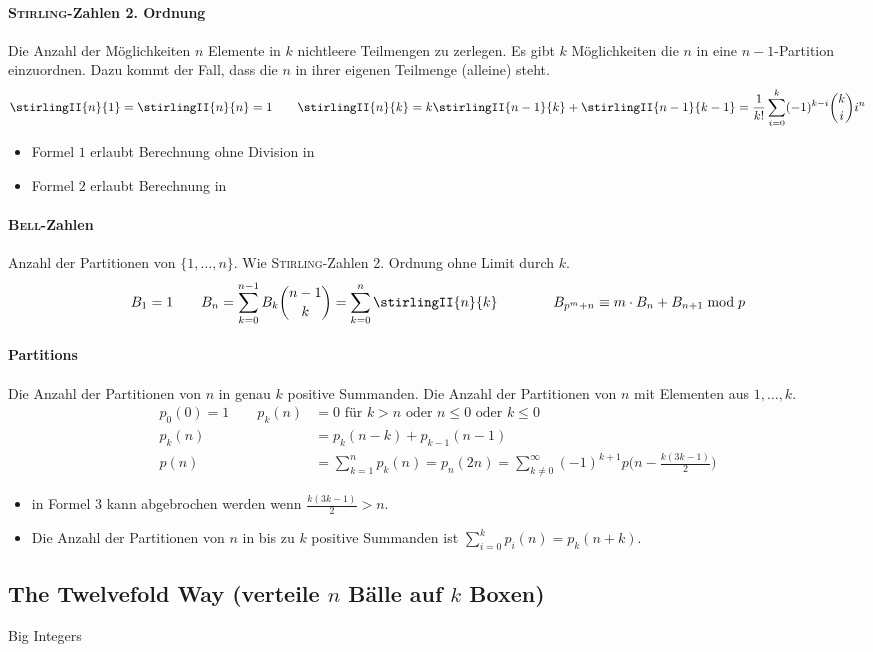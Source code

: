 \paragraph{\textsc{Stirling}-Zahlen 2. Ordnung}
Die Anzahl der Möglichkeiten $n$ Elemente in $k$ nichtleere Teilmengen zu zerlegen.
Es gibt $k$ Möglichkeiten die $n$ in eine $n-1$-Partition einzuordnen.
Dazu kommt der Fall, dass die $n$ in ihrer eigenen Teilmenge (alleine) steht.
\[\stirlingII{n}{1} = \stirlingII{n}{n} = 1 \qquad
\stirlingII{n}{k} = k \stirlingII{n-1}{k} + \stirlingII{n-1}{k-1} =
\frac{1}{k!} \sum\limits_{i=0}^{k} (-1)^{k-i}\binom{k}{i}i^n\]
\begin{itemize}
	\item Formel $1$ erlaubt Berechnung ohne Division in 
	\item Formel $2$ erlaubt Berechnung in 
\end{itemize}

\paragraph{\textsc{Bell}-Zahlen}
Anzahl der Partitionen von $\{1, \ldots, n\}$.
Wie \textsc{Stirling}-Zahlen 2. Ordnung ohne Limit durch $k$.
\[B_1 = 1 \qquad
B_n = \sum\limits_{k = 0}^{n - 1} B_k\binom{n-1}{k}
= \sum\limits_{k = 0}^{n}\stirlingII{n}{k}\qquad\qquad B_{p^m+n}\equiv m\cdot B_n + B_{n+1} \bmod{p}\]

\paragraph{Partitions}
Die Anzahl der Partitionen von $n$ in genau $k$ positive Summanden.
Die Anzahl der Partitionen von $n$ mit Elementen aus ${1,\dots,k}$.
\begin{align*}
	p_0(0)=1 \qquad p_k(n)&=0 \text{ für } k > n \text{ oder } n \leq 0 \text{ oder } k \leq 0\\
	p_k(n)&= p_k(n-k) + p_{k-1}(n-1)\\[2pt]
	p(n)&=\sum_{k=1}^{n} p_k(n)=p_n(2n)=\sum\limits_{k\neq0}^\infty(-1)^{k+1}p\bigg(n - \frac{k(3k-1)}{2}\bigg)
\end{align*}
\begin{itemize}
	\item in Formel $3$ kann abgebrochen werden wenn $\frac{k(3k-1)}{2} > n$.
	\item Die Anzahl der Partitionen von $n$ in bis zu $k$ positive Summanden ist $\sum\limits_{i=0}^{k}p_i(n)=p_k(n+k)$.
\end{itemize}

\subsection{The Twelvefold Way \textnormal{(verteile $n$ Bälle auf $k$ Boxen)}}


%

\begin{algorithm}[optional]{Big Integers}
\end{algorithm}
